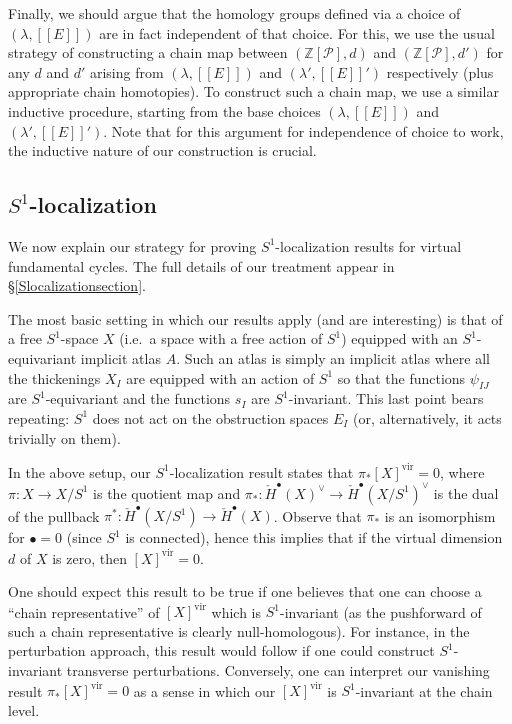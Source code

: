 \documentclass[12pt]{article}
\theoremstyle{definition}
\theoremstyle{remark}
\numberwithin{equation}{subsection}
\newcommand{\PPP}{\mathcal P}
\newcommand{\cH}{\check H}
\newcommand{\vir}{\mathrm{vir}}
\begin{document}
Finally, we should argue that the homology groups defined via a choice of $(\lambda,[[E]])$ are in fact independent of that choice.  For this, we use the usual strategy of constructing a chain map between $(\mathbb Z[\PPP],d)$ and $(\mathbb Z[\PPP],d')$ for any $d$ and $d'$ arising from $(\lambda,[[E]])$ and $(\lambda',[[E]]')$ respectively (plus appropriate chain homotopies).  To construct such a chain map, we use a similar inductive procedure, starting from the base choices $(\lambda,[[E]])$ and $(\lambda',[[E]]')$.  Note that for this argument for independence of choice to work, the inductive nature of our construction is crucial.

\subsection{\texorpdfstring{$S^1$}{S{\textasciicircum}1}-localization}\label{Slocalintrosec}

We now explain our strategy for proving $S^1$-localization results for virtual fundamental cycles.  The full details of our treatment appear in \S\ref{Slocalizationsection}.

The most basic setting in which our results apply (and are interesting) is that of a free $S^1$-space $X$ (i.e.\ a space with a free action of $S^1$) equipped with an $S^1$-equivariant implicit atlas $A$.  Such an atlas is simply an implicit atlas where all the thickenings $X_I$ are equipped with an action of $S^1$ so that the functions $\psi_{IJ}$ are $S^1$-equivariant and the functions $s_I$ are $S^1$-invariant.  This last point bears repeating: $S^1$ does not act on the obstruction spaces $E_I$ (or, alternatively, it acts trivially on them).

In the above setup, our $S^1$-localization result states that $\pi_\ast[X]^\vir=0$, where $\pi:X\to X/S^1$ is the quotient map and $\pi_\ast:\cH^\bullet(X)^\vee\to\cH^\bullet(X/S^1)^\vee$ is the dual of the pullback $\pi^\ast:\cH^\bullet(X/S^1)\to\cH^\bullet(X)$.  Observe that $\pi_\ast$ is an isomorphism for $\bullet=0$ (since $S^1$ is connected), hence this implies that if the virtual dimension $d$ of $X$ is zero, then $[X]^\vir=0$.

One should expect this result to be true if one believes that one can choose a ``chain representative'' of $[X]^\vir$ which is $S^1$-invariant (as the pushforward of such a chain representative is clearly null-homologous).  For instance, in the perturbation approach, this result would follow if one could construct $S^1$-invariant transverse perturbations.  Conversely, one can interpret our vanishing result $\pi_\ast[X]^\vir=0$ as a sense in which our $[X]^\vir$ is $S^1$-invariant at the chain level.
\end{document}
